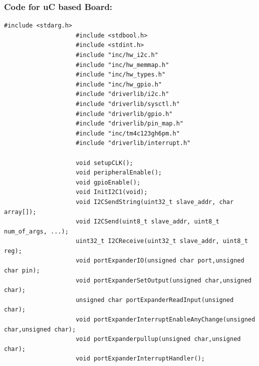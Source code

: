 \documentclass[a4paper,10pt,oneside]{article}
\begin{document}
			\subsubsection{\textbf{Code for uC based Board:}}
				\begin{lstlisting}[style=CStyle]
					#include <stdarg.h>
					#include <stdbool.h>
					#include <stdint.h>
					#include "inc/hw_i2c.h"
					#include "inc/hw_memmap.h"
					#include "inc/hw_types.h"
					#include "inc/hw_gpio.h"
					#include "driverlib/i2c.h"
					#include "driverlib/sysctl.h"
					#include "driverlib/gpio.h"
					#include "driverlib/pin_map.h"
					#include "inc/tm4c123gh6pm.h"
					#include "driverlib/interrupt.h"
					
					void setupCLK();
					void peripheralEnable();
					void gpioEnable();
					void InitI2C1(void);
					void I2CSendString(uint32_t slave_addr, char array[]);
					void I2CSend(uint8_t slave_addr, uint8_t num_of_args, ...);
					uint32_t I2CReceive(uint32_t slave_addr, uint8_t reg);
					void portExpanderIO(unsigned char port,unsigned char pin);
					void portExpanderSetOutput(unsigned char,unsigned char);
					unsigned char portExpanderReadInput(unsigned char);
					void portExpanderInterruptEnableAnyChange(unsigned char,unsigned char);
					void portExpanderpullup(unsigned char,unsigned char);
					void portExpanderInterruptHandler();
					

\end{lstlisting}
\end{document}

